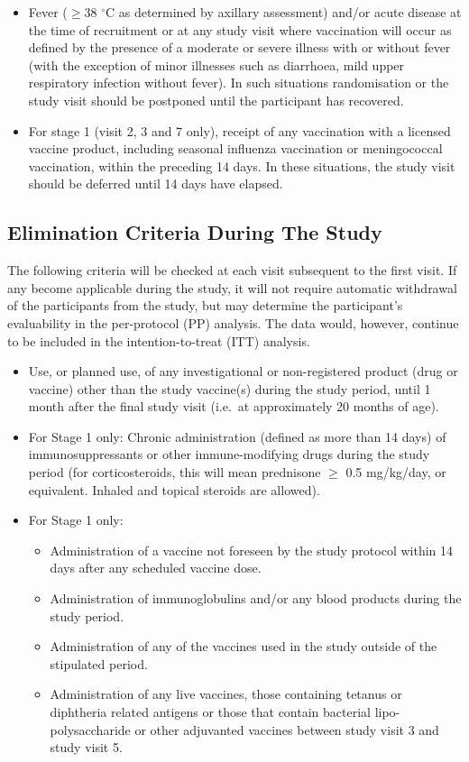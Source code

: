 \documentclass{bmcart}
\begin{document}
\begin{itemize}
	\item Fever ($\geq$38 $^{\circ}$C as determined by axillary assessment) and/or acute disease at the time of recruitment or at any study visit where vaccination will occur as defined by the presence of a moderate or severe illness with or without fever (with the exception of minor illnesses such as diarrhoea, mild upper respiratory infection without fever). In such situations randomisation or the study visit should be postponed until the participant has recovered.
	\item For stage 1 (visit 2, 3 and 7 only), receipt of any vaccination with a licensed vaccine product, including seasonal influenza vaccination or meningococcal vaccination, within the preceding 14 days. In these situations, the study visit should be deferred until 14 days have elapsed.
\end{itemize}

\subsection*{Elimination Criteria During The Study}

The following criteria will be checked at each visit subsequent to the first visit.
If any become applicable during the study, it will not require automatic withdrawal of the participants from the study, but may determine the participant's evaluability in the per-protocol (PP) analysis.
The data would, however, continue to be included in the intention-to-treat (ITT) analysis.

\begin{itemize}
	\item Use, or planned use, of any investigational or non-registered product (drug or vaccine) other than the study vaccine(s) during the study period, until 1 month after the final study visit (i.e.~at approximately 20 months of age).
	\item For Stage 1 only: Chronic administration (defined as more than 14 days) of immunosuppressants or other immune-modifying drugs during the study period (for corticosteroids, this will mean prednisone $\geq$ 0.5 mg/kg/day, or equivalent. Inhaled and topical steroids are allowed).
	\item For Stage 1 only:
	
	\begin{itemize}
		\item Administration of a vaccine not foreseen by the study protocol within 14 days after any scheduled vaccine dose.
		\item Administration of immunoglobulins and/or any blood products during the study period.
		\item Administration of any of the vaccines used in the study outside of the stipulated period.
		\item Administration of any live vaccines, those containing tetanus or diphtheria related antigens or those that contain bacterial lipo-polysaccharide or other adjuvanted vaccines between study visit 3 and study visit 5.
	\end{itemize}
\end{itemize}
\end{document}
